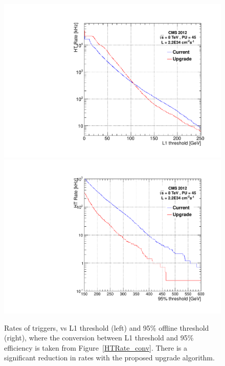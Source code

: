\begin{figure}[t!]
\begin{center}
  \includegraphics[scale=0.3]{Figures/l1jets/HTRates_2e34.pdf}
    \includegraphics[scale=0.3]{Figures/l1jets/HTRates_95thresh_2e34.pdf}
\caption{Rates of \HT triggers, vs L1 threshold (left) and 95\% offline threshold (right), where the conversion between L1 threshold and 95\% efficiency is taken from Figure~\ref{HTRate_conv}. There is a significant reduction in rates with the proposed upgrade algorithm.}
\label{HTRate}
\end{center}
\end{figure}

 

